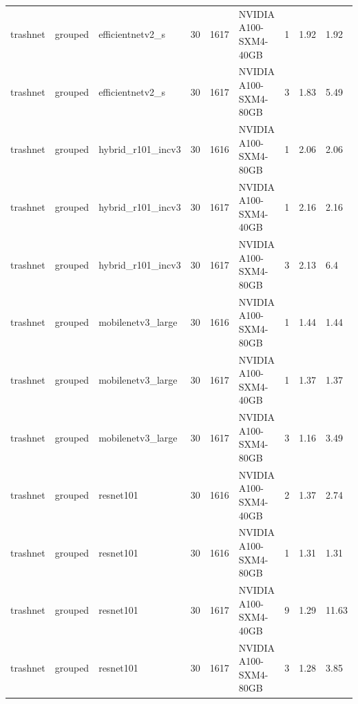 \begin{table}[ht]
\begin{tabular}{lllllllll}
trashnet & grouped & efficientnetv2\_s & 30 & 1617 & NVIDIA A100-SXM4-40GB & 1 & 1.92 & 1.92 \\
trashnet & grouped & efficientnetv2\_s & 30 & 1617 & NVIDIA A100-SXM4-80GB & 3 & 1.83 & 5.49 \\
trashnet & grouped & hybrid\_r101\_incv3 & 30 & 1616 & NVIDIA A100-SXM4-80GB & 1 & 2.06 & 2.06 \\
trashnet & grouped & hybrid\_r101\_incv3 & 30 & 1617 & NVIDIA A100-SXM4-40GB & 1 & 2.16 & 2.16 \\
trashnet & grouped & hybrid\_r101\_incv3 & 30 & 1617 & NVIDIA A100-SXM4-80GB & 3 & 2.13 & 6.4 \\
trashnet & grouped & mobilenetv3\_large & 30 & 1616 & NVIDIA A100-SXM4-80GB & 1 & 1.44 & 1.44 \\
trashnet & grouped & mobilenetv3\_large & 30 & 1617 & NVIDIA A100-SXM4-40GB & 1 & 1.37 & 1.37 \\
trashnet & grouped & mobilenetv3\_large & 30 & 1617 & NVIDIA A100-SXM4-80GB & 3 & 1.16 & 3.49 \\
trashnet & grouped & resnet101 & 30 & 1616 & NVIDIA A100-SXM4-40GB & 2 & 1.37 & 2.74 \\
trashnet & grouped & resnet101 & 30 & 1616 & NVIDIA A100-SXM4-80GB & 1 & 1.31 & 1.31 \\
trashnet & grouped & resnet101 & 30 & 1617 & NVIDIA A100-SXM4-40GB & 9 & 1.29 & 11.63 \\
trashnet & grouped & resnet101 & 30 & 1617 & NVIDIA A100-SXM4-80GB & 3 & 1.28 & 3.85 \\
\hline
\end{tabular}
\end{table}